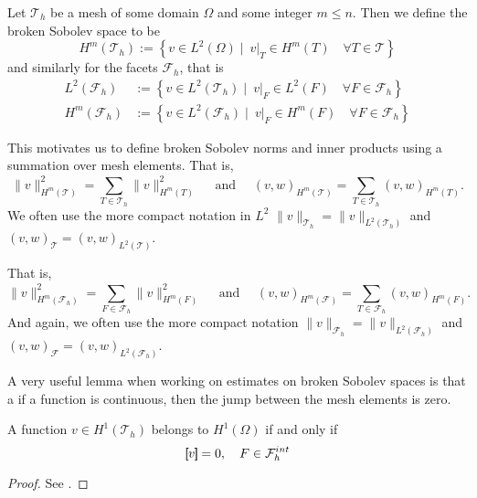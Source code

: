 \begin{definition}
Let $\mathcal{T}_{h} $ be a mesh of some domain $\Omega  $ and some integer $m\le n$. Then we define the broken Sobolev space to be \[
H^{m}( \mathcal{T}_{h} ) := \left\{ v \in L^2( \Omega )  \mid \ v|_{T} \in H^{m}( T) \quad     \forall T \in  \mathcal{T} \right\}
\]
and similarly for the facets $\mathcal{F}_{h} $, that is
\[
    \begin{split}
        L^{2}( \mathcal{F}_{h} ) &:= \left\{ v \in L^2( \mathcal{T}_{h}  )  \mid   \ v|_{F} \in L^{2}( F)  \quad  \forall F \in  \mathcal{F}_{h}   \right\} \\
        H^{m}( \mathcal{F}_{h} ) &:= \left\{ v \in L^2( \mathcal{F}_{h}  )  \mid   \ v|_{F} \in H^{m}( F)  \quad  \forall F \in  \mathcal{F}_{h}   \right\}
    \end{split}
\]
\end{definition}
This motivates us to define broken Sobolev norms and inner products using a summation over mesh elements. That is,
\[
 \| v \|_{H^{m}( \mathcal{T} ) }^{2} = \sum_{T \in  \mathcal{T}_{h} }^{} \| v  \|_{ H^{m}( T ) }^{2  } \quad \text{ and } \quad
 (v ,w )_{H^{m}( \mathcal{T} ) }^{} = \sum_{T \in \mathcal{T} _{h}}^{} (v ,w )_{ H^{m}( T ) }^{  } .
\]
We often use the more compact notation in $L^{2}$  $\| v \|_{\mathcal{T}_{h}} =  \| v \|_{L^{2}( \mathcal{T}_{h} ) }$ and  $(v ,w )_{ \mathcal{T} }^{} = (v ,w )_{L^2( \mathcal{T} ) }^{} $.

That is,
\[
 \| v \|_{H^{m}( \mathcal{F}_{h} ) }^{2} = \sum_{F \in  \mathcal{F}_{h} }^{} \| v  \|_{ H^{m}( F ) }^{2  } \quad \text{ and } \quad
 (v ,w )_{H^{m}( \mathcal{F} ) }^{} = \sum_{T \in \mathcal{F} _{h}}^{} (v ,w )_{ H^{m}( F ) }^{  } .
\]
And again, we often use the more compact notation $\| v \|_{\mathcal{F}_{h}} =  \| v \|_{L^{2}( \mathcal{F}_{h} ) }$ and  $(v ,w )_{ \mathcal{F} }^{} = (v ,w )_{L^2( \mathcal{F}_{h} ) }^{} $.


A very useful lemma when working on estimates on broken Sobolev spaces is that a if a function is continuous, then the jump between the mesh elements is zero.
\begin{lemma}
    A function $ v \in  H^{1}( \mathcal{T}_{h} ) $ belongs to $ H^{1}( \Omega )  $ if and only if \[
    \left[\!\!\left[  v  \right]\!\!\right]   = 0, \quad F \in \mathcal{F}^{int}_{h}
    \]
\end{lemma}
\begin{proof}
    See \cite[Lemma 1.23]{pietro2012}.
\end{proof}


